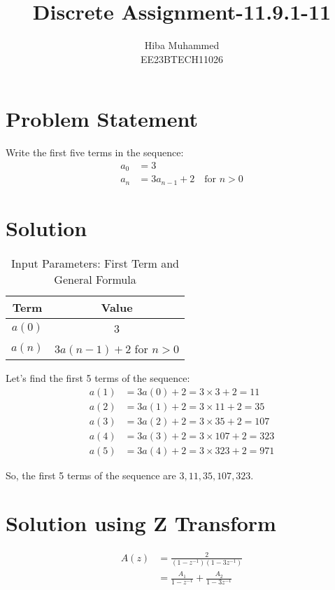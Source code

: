 \documentclass[12pt]{article}
\title{Discrete Assignment-11.9.1-11}
\author{Hiba Muhammed \\
        EE23BTECH11026}
\date{} %
\begin{document}
\maketitle

\section*{Problem Statement}
Write the first five terms in the sequence:
\begin{align*}
a_{0}  &= 3 \\
a_{n}  &= 3a_{n-1} + 2 \quad \text{for } n > 0
\end{align*}

\section*{Solution}
\begin{table}[h]
  \centering
  \caption{Input Parameters: First Term and General Formula}
  \begin{tabular}{|c|c|}
    \hline
    \textbf{Term} & \textbf{Value} \\
    \hline
    \(a(0)\) & 3 \\
    \(a(n)\) & \(3a(n-1) + 2\) for \(n > 0\) \\
    \hline
  \end{tabular}
\end{table}

Let's find the first 5 terms of the sequence:
\begin{align}
a(1) &= 3a(0)  + 2 = 3 \times 3 + 2 = 11 \\
a(2) &= 3a(1) + 2 = 3 \times 11 + 2 = 35 \\
a(3) &= 3a(2) + 2 = 3 \times 35 + 2 = 107 \\
a(4) &= 3a(3) + 2 = 3 \times 107 + 2 = 323 \\
a(5) &= 3a(4) + 2 = 3 \times 323 + 2 = 971 
\end{align}

So, the first 5 terms of the sequence are \(3, 11, 35, 107, 323\).

\section*{Solution using Z Transform}
\begin{align*}
A(z) &= \frac{2}{(1-z^{-1})(1-3z^{-1})} \\
&= \frac{A_1}{1-z^{-1}} + \frac{A_2}{1-3z^{-1}}
\end{align*}
\end{document}

